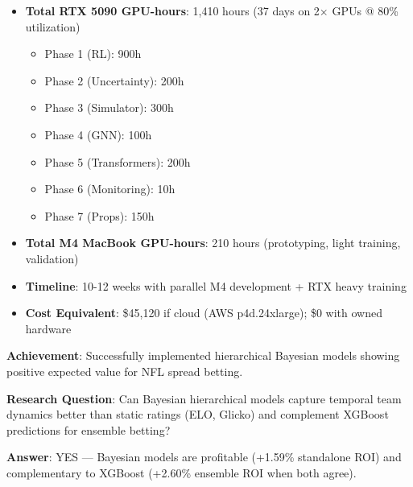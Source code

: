 \begin{itemize}
  \item \textbf{Total RTX 5090 GPU-hours}: 1,410 hours (37 days on 2$\times$ GPUs @ 80\% utilization)
  \begin{itemize}
    \item Phase 1 (RL): 900h
    \item Phase 2 (Uncertainty): 200h
    \item Phase 3 (Simulator): 300h
    \item Phase 4 (GNN): 100h
    \item Phase 5 (Transformers): 200h
    \item Phase 6 (Monitoring): 10h
    \item Phase 7 (Props): 150h
  \end{itemize}
  \item \textbf{Total M4 MacBook GPU-hours}: 210 hours (prototyping, light training, validation)
  \item \textbf{Timeline}: 10-12 weeks with parallel M4 development + RTX heavy training
  \item \textbf{Cost Equivalent}: \$45,120 if cloud (AWS p4d.24xlarge); \$0 with owned hardware
\end{itemize}


\textbf{Achievement}: Successfully implemented hierarchical Bayesian models showing positive expected value for NFL spread betting.

\textbf{Research Question}: Can Bayesian hierarchical models capture temporal team dynamics better than static ratings (ELO, Glicko) and complement XGBoost predictions for ensemble betting?

\textbf{Answer}: \textcolor{green!60!black}{YES} — Bayesian models are profitable (+1.59\% standalone ROI) and complementary to XGBoost (+2.60\% ensemble ROI when both agree).

